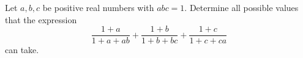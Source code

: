 Let $a,b,c$ be positive real numbers with $abc=1$. Determine all possible values that the expression
$$\frac{1+a}{1+a+ab}+\frac{1+b}{1+b+bc}+\frac{1+c}{1+c+ca}$$
can take.